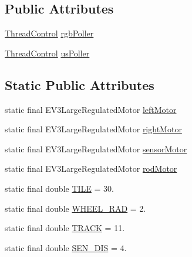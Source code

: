 \subsection*{Public Attributes}
\begin{DoxyCompactItemize}
\item 
\hyperlink{classca_1_1mcgill_1_1ecse211_1_1threads_1_1_thread_control}{Thread\+Control} \hyperlink{enumca_1_1mcgill_1_1ecse211_1_1project_1_1_game_af24a953a0c3438670220dde36c532b5d}{rgb\+Poller}
\item 
\hyperlink{classca_1_1mcgill_1_1ecse211_1_1threads_1_1_thread_control}{Thread\+Control} \hyperlink{enumca_1_1mcgill_1_1ecse211_1_1project_1_1_game_af6fee74efff891793b32352caa110465}{us\+Poller}
\end{DoxyCompactItemize}
\subsection*{Static Public Attributes}
\begin{DoxyCompactItemize}
\item 
static final E\+V3\+Large\+Regulated\+Motor \hyperlink{enumca_1_1mcgill_1_1ecse211_1_1project_1_1_game_a7c673571bf50fdb6917a9d7bb671e003}{left\+Motor}
\item 
static final E\+V3\+Large\+Regulated\+Motor \hyperlink{enumca_1_1mcgill_1_1ecse211_1_1project_1_1_game_a7a05fcf37c4435c32270776a427ba0d2}{right\+Motor}
\item 
static final E\+V3\+Large\+Regulated\+Motor \hyperlink{enumca_1_1mcgill_1_1ecse211_1_1project_1_1_game_aa94b85dc88de85d959677bd6c0f98989}{sensor\+Motor}
\item 
static final E\+V3\+Large\+Regulated\+Motor \hyperlink{enumca_1_1mcgill_1_1ecse211_1_1project_1_1_game_abc070af2fa5a5cda6d81977b35aacfb4}{rod\+Motor}
\item 
static final double \hyperlink{enumca_1_1mcgill_1_1ecse211_1_1project_1_1_game_a72c2224ad4dd557dde445ebc4baaf531}{T\+I\+LE} = 30.
\item 
static final double \hyperlink{enumca_1_1mcgill_1_1ecse211_1_1project_1_1_game_a91bd64670c2a91d006c907142783b1f8}{W\+H\+E\+E\+L\+\_\+\+R\+AD} = 2.
\item 
static final double \hyperlink{enumca_1_1mcgill_1_1ecse211_1_1project_1_1_game_a64cf12cdd6772ac1ce351ff1dfadd626}{T\+R\+A\+CK} = 11.
\item 
static final double \hyperlink{enumca_1_1mcgill_1_1ecse211_1_1project_1_1_game_ab940d1a52b9759294dc0229e0fd6bc06}{S\+E\+N\+\_\+\+D\+IS} = 4.
\end{DoxyCompactItemize}


